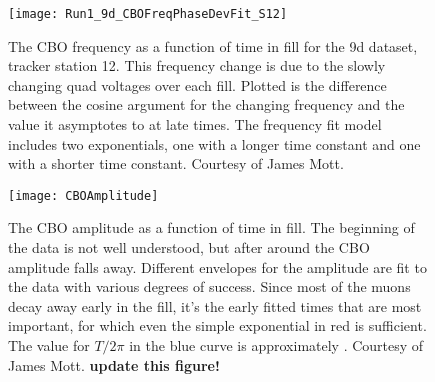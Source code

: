 
\begin{figure}[]
    \centering
    \texttt{[image: Run1\_9d\_CBOFreqPhaseDevFit\_S12]}
    \caption[CBO frequency as a function of time]{The CBO frequency as a function of time in fill for the 9d dataset, tracker station 12. This frequency change is due to the slowly changing quad voltages over each fill. Plotted is the difference between the cosine argument for the changing frequency and the value it asymptotes to at late times. The frequency fit model includes two exponentials, one with a longer time constant and one with a shorter time constant. Courtesy of James Mott.}
    \label{fig:CBOFrequency}
\end{figure}



\begin{figure}[]
    \centering
    \texttt{[image: CBOAmplitude]}
    \caption[CBO amplitude as a function of time]{The CBO amplitude as a function of time in fill. The beginning of the data is not well understood, but after around  the CBO amplitude falls away. Different envelopes for the amplitude are fit to the data with various degrees of success. Since most of the muons decay away early in the fill, it's the early fitted times that are most important, for which even the simple exponential in red is sufficient. The value for $T/2\pi$ in the blue curve is approximately . Courtesy of James Mott. \textbf{update this figure!}}
    \label{fig:CBOAmplitude}
\end{figure}







\cleardoublepage





